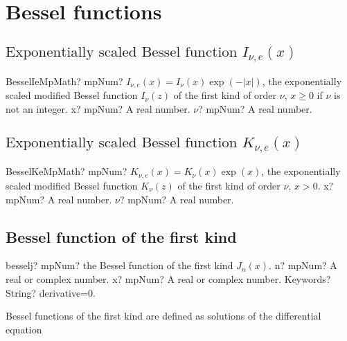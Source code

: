 \section{Bessel functions}

\subsection{\texorpdfstring{$\text{Exponentially scaled Bessel function }I_{\nu,e}(x)$}{Bessel Function Inu Scaled}}

\begin{mpFunctionsExtract}
	\mpFunctionTwoNotImplemented
	{BesselIeMpMath? mpNum? $I_{\nu, e}(x) = I_{\nu}(x) \exp(-|x|)$, the exponentially scaled modified Bessel function $I_{\nu}(z)$ of the first kind of order $\nu$, $x \geq 0$ if $\nu$ is not an integer.}
	{x? mpNum? A real number.}
	{$\nu$? mpNum? A real number.}
\end{mpFunctionsExtract}




\subsection{\texorpdfstring{$\text{Exponentially scaled Bessel function }K_{\nu,e}(x)$}{Bessel Function Knu Scaled}}

\begin{mpFunctionsExtract}
	\mpFunctionTwoNotImplemented
	{BesselKeMpMath? mpNum? $K_{\nu, e}(x) = K_{\nu}(x) \exp(x)$, the exponentially scaled modified Bessel function $K_{\nu}(z)$ of the first kind of order $\nu$, $x > 0$.}
	{x? mpNum? A real number.}
	{$\nu$? mpNum? A real number.}
\end{mpFunctionsExtract}



\subsection{Bessel function of the first kind}

\begin{mpFunctionsExtract}
	\mpFunctionThree
	{besselj? mpNum? the Bessel function of the first kind $J_n(x)$.}
	{n? mpNum? A real or complex number.}
	{x? mpNum? A real or complex number.}	
	{Keywords? String? derivative=0.}	
\end{mpFunctionsExtract}

\vpara
Bessel functions of the first kind are defined as solutions of the differential equation

